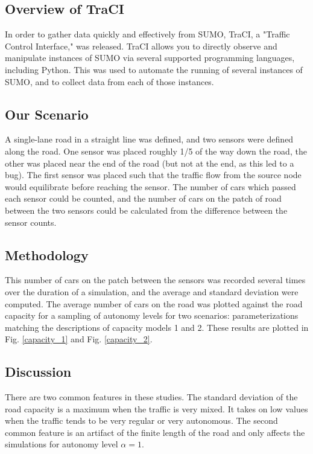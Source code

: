 \documentclass[11pt,nofootinbib]{revtex4}
\begin{document}
\subsection{Overview of TraCI}
In order to gather data quickly and effectively from SUMO, TraCI, a "Traffic Control Interface," was released. TraCI allows you to directly observe and manipulate instances of SUMO via several supported programming languages, including Python. This was used to automate the running of several instances of SUMO, and to collect data from each of those instances. 

\subsection{Our Scenario}
A single-lane road in a straight line was defined, and two sensors were defined along the road. One sensor was placed roughly 1/5 of the way down the road, the other was placed near the end of the road (but not at the end, as this led to a bug). The first sensor was placed such that the traffic flow from the source node would equilibrate before reaching the sensor. The number of cars which passed each sensor could be counted, and the number of cars on the patch of road between the two sensors could be calculated from the difference between the sensor counts.

\subsection{Methodology}

This number of cars on the patch between the sensors was recorded several times over the duration of a simulation, and the average and standard deviation were computed. The average number of cars on the road was plotted against the road capacity for a sampling of autonomy levels for two scenarios: parameterizations matching the descriptions of capacity models 1 and 2. These results are plotted in Fig. \ref{capacity_1} and Fig. \ref{capacity_2}. 

\subsection{Discussion}

There are two common features in these studies. The standard deviation of the road capacity is a maximum when the traffic is very mixed. It takes on low values when the traffic tends to be very regular or very autonomous. The second common feature is an artifact of the finite length of the road and only affects the simulations for autonomy level $\alpha=1$. 
\end{document}
